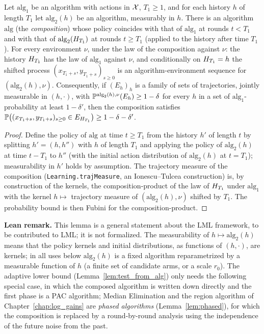 \begin{lemma}\label{lem:composition}
Let $\mathrm{alg}_1$ be an algorithm with actions in $\mathcal{X}$, $T_1 \ge 1$, and for each history
$h$ of length $T_1$ let $\mathrm{alg}_2(h)$ be an algorithm, measurably in $h$. There is an
algorithm $\mathrm{alg}$ (the \emph{composition}) whose policy coincides with that of
$\mathrm{alg}_1$ at rounds $t < T_1$ and with that of $\mathrm{alg}_2(H_{T_1})$ at rounds
$t \ge T_1$ (applied to the history after time $T_1$). For every environment $\nu$, under the
law of the composition against $\nu$: the history $H_{T_1}$ has the law of
$\mathrm{alg}_1$ against $\nu$, and conditionally on $H_{T_1} = h$ the shifted process
$(x_{T_1+s}, y_{T_1+s})_{s\ge 0}$ is an algorithm-environment sequence for
$(\mathrm{alg}_2(h), \nu)$. Consequently, if $(E_h)_h$ is a family of sets of trajectories, jointly measurable in
$(h, \cdot)$, with
$\mathbb{P}^{\mathrm{alg}_2(h),\nu}(E_h) \ge 1-\delta$ for every $h$ in a set of $\mathrm{alg}_1$-probability
at least $1 - \delta'$, then the composition satisfies
$\mathbb{P}\big((x_{T_1+s},y_{T_1+s})_{s \ge 0} \in E_{H_{T_1}}\big) \ge 1 - \delta - \delta'$.
\end{lemma}

\begin{proof}
Define the policy of $\mathrm{alg}$ at time $t\ge T_1$ from the history $h'$ of length $t$ by
splitting $h' = (h, h'')$ with $h$ of length $T_1$ and applying the policy of
$\mathrm{alg}_2(h)$ at time $t - T_1$ to $h''$ (with the initial action distribution of
$\mathrm{alg}_2(h)$ at $t = T_1$); measurability in $h'$ holds by assumption. The trajectory
measure of the composition (\texttt{Learning.trajMeasure}, an Ionescu--Tulcea construction)
is, by construction of the kernels, the composition-product of the law of $H_{T_1}$ under
$\mathrm{alg}_1$ with the kernel $h \mapsto$ trajectory measure of $(\mathrm{alg}_2(h),\nu)$
shifted by $T_1$. The probability bound is then Fubini for the composition-product.
\end{proof}

\textbf{Lean remark.} This lemma is a general statement about the LML framework, to be
contributed to LML; it is not formalized. The measurability of $h \mapsto \mathrm{alg}_2(h)$ means that the policy
kernels and initial distributions, as functions of $(h, \cdot)$, are kernels; in all uses
below $\mathrm{alg}_2(h)$ is a fixed algorithm reparametrized by a measurable function of $h$
(a finite set of candidate arms, or a scale $r_0$). The adaptive lower bound
(Lemma~\ref{lem:test_from_alg}) only needs the following special case, in which the composed
algorithm is written down directly and the first phase is a PAC algorithm; Median Elimination
and the region algorithm of Chapter~\ref{chap:log_gains} are \emph{phased algorithms}
(Lemma~\ref{lem:phased}), for which the composition is replaced by a round-by-round analysis
using the independence of the future noise from the past.

